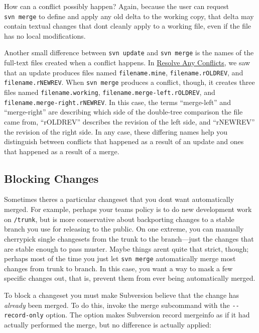 How can a conflict possibly happen? Again, because the user can request
\texttt{svn\ merge} to define and apply any old delta to the working
copy, that delta may contain textual changes that don\textquotesingle t
cleanly apply to a working file, even if the file has no local
modifications.

Another small difference between \texttt{svn\ update} and
\texttt{svn\ merge} is the names of the full-text files created when a
conflict happens. In \hyperref[svn.tour.cycle.resolve]{Resolve Any
Conflicts}, we saw that an update produces files named
\texttt{filename.mine}, \texttt{filename.rOLDREV}, and
\texttt{filename.rNEWREV}. When \texttt{svn\ merge} produces a conflict,
though, it creates three files named \texttt{filename.working},
\texttt{filename.merge-left.rOLDREV}, and
\texttt{filename.merge-right.rNEWREV}. In this case, the terms
``merge-left'' and ``merge-right'' are describing which side of the
double-tree comparison the file came from, ``rOLDREV'' describes the
revision of the left side, and ``rNEWREV'' the revision of the right
side. In any case, these differing names help you distinguish between
conflicts that happened as a result of an update and ones that happened
as a result of a merge.

\subsection{Blocking
Changes}\label{svn.branchmerge.advanced.blockchanges}

Sometimes there\textquotesingle s a particular changeset that you
don\textquotesingle t want automatically merged. For example, perhaps
your team\textquotesingle s policy is to do new development work on
\texttt{/trunk}, but is more conservative about backporting changes to a
stable branch you use for releasing to the public. On one extreme, you
can manually cherrypick single changesets from the trunk to the
branch---just the changes that are stable enough to pass muster. Maybe
things aren\textquotesingle t quite that strict, though; perhaps most of
the time you just let \texttt{svn\ merge} automatically merge most
changes from trunk to branch. In this case, you want a way to mask a few
specific changes out, that is, prevent them from ever being
automatically merged.

To block a changeset you must make Subversion believe that the change
has \emph{already} been merged. To do this, invoke the merge subcommand
with the \texttt{-\/-record-only} option. The option makes Subversion
record mergeinfo as if it had actually performed the merge, but no
difference is actually applied:

